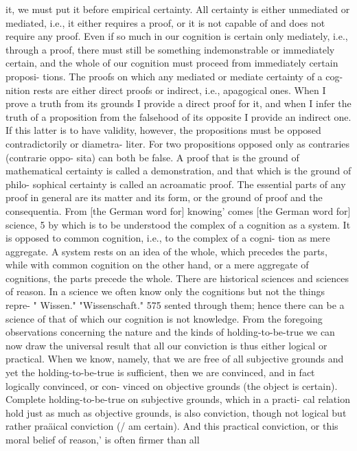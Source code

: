 it, we must put it before empirical certainty.
All certainty is either unmediated or mediated, i.e., it either requires a
proof, or it is not capable of and does not require any proof. Even if so
much in our cognition is certain only mediately, i.e., through a proof,
there must still be something indemonstrable or immediately certain, and the
whole of our cognition must proceed from immediately certain proposi-
tions.
The proofs on which any mediated or mediate certainty of a cog-
nition rests are either direct proofs or indirect, i.e., apagogical ones.
When I prove a truth from its grounds I provide a direct proof for it,
and when I infer the truth of a proposition from the falsehood of its
opposite I provide an indirect one. If this latter is to have validity,
however, the propositions must be opposed contradictorily or diametra-
liter. For two propositions opposed only as contraries (contrarie oppo-
sita) can both be false. A proof that is the ground of mathematical
certainty is called a demonstration, and that which is the ground of philo-
sophical certainty is called an acroamatic proof. The essential parts of
any proof in general are its matter and its form, or the ground of proof
and the consequentia.
From [the German word for] knowing' comes [the German word for]
science, 5 by which is to be understood the complex of a cognition as a
system. It is opposed to common cognition, i.e., to the complex of a cogni-
tion as mere aggregate. A system rests on an idea of the whole, which
precedes the parts, while with common cognition on the other hand, or a
mere aggregate of cognitions, the parts precede the whole. There are
historical sciences and sciences of reason.
In a science we often know only the cognitions but not the things repre-
" Wissen."
"Wissenschaft."
575
sented through them; hence there can be a science of that of which our
cognition is not knowledge.
From the foregoing observations concerning the nature and the kinds of
holding-to-be-true we can now draw the universal result that all our
conviction is thus either logical or practical. When we know, namely, that
we are free of all subjective grounds and yet the holding-to-be-true is
sufficient, then we are convinced, and in fact logically convinced, or con-
vinced on objective grounds (the object is certain).
Complete holding-to-be-true on subjective grounds, which in a practi-
cal relation hold just as much as objective grounds, is also conviction,
though not logical but rather praäical conviction (/ am certain). And this
practical conviction, or this moral belief of reason,' is often firmer than all
